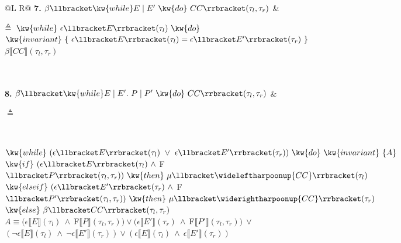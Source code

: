 \begin{figure}[ht]
\begin{minipage}{\linewidth}
\begin{tabularx}{\linewidth}{@{}L R@{}}
      \textbf{7. } $\beta\llbracket \kw{while } E\mid E' \ \kw{do}\ CC\rrbracket(\tau_l,\tau_r)$ &
      \parbox[t]{\hsize}{%
        $\triangleq\ \kw{while}\ \epsilon\llbracket E\rrbracket(\tau_l)\ \kw{do}$\\[2pt]
        \hspace{2.2em}\text{  }\text{  }\text{  }\text{  }\text{  }\text{  }\text{  }\text{  } $\kw{invariant}\ \{\ \epsilon\llbracket E\rrbracket(\tau_l)=\epsilon\llbracket E'\rrbracket(\tau_r)\ \}$\\[2pt]
        \hspace{2.2em}\text{  }\text{  }\text{  }\text{  }\text{  }\text{  }\text{  }\text{  } $\beta\llbracket CC\rrbracket(\tau_l,\tau_r)$
      } \\[8pt]
      \\

      \textbf{8. } $\beta\llbracket \kw{while } E\mid E' .\ P\mid P' \ \kw{do}\ CC\rrbracket(\tau_l,\tau_r)$ &
      \parbox[t]{\hsize}{$\triangleq$} \\[2pt]
    \end{tabularx} 

    \vspace{2pt} 
    \noindent\begin{minipage}[t]{\linewidth} 
      \raggedright
      \hspace{1.1em}$\kw{while}\ (\epsilon\llbracket E\rrbracket(\tau_l)\ \lor\ \epsilon\llbracket E'\rrbracket(\tau_r))\ \kw{do}\ \kw{invariant}\ \{A\}$\\[2pt]
      \hspace{2.2em}$\kw{if}\ (\epsilon\llbracket E\rrbracket(\tau_l)\ \land\ $F$\llbracket P\rrbracket(\tau_l,\tau_r))\ \kw{then}\ \mu\llbracket \wideleftharpoonup{CC}\rrbracket(\tau_l)$\\[2pt]
      \hspace{2.2em}$\kw{else if}\ (\epsilon\llbracket E'\rrbracket(\tau_r)\ \land\ $F$\llbracket P'\rrbracket(\tau_l,\tau_r))\ \kw{then}\ \mu\llbracket \widerightharpoonup{CC}\rrbracket(\tau_r)$\\[2pt]
      \hspace{2.2em}$\kw{else}\ \beta\llbracket CC\rrbracket(\tau_l,\tau_r)$\\[2pt]
      \hspace{1.2em} $A \equiv (\epsilon\llbracket E\rrbracket(\tau_l)\ \land\ $F$\llbracket P\rrbracket(\tau_l,\tau_r)) \lor (\epsilon\llbracket E'\rrbracket(\tau_r)\ \land\ $F$\llbracket P'\rrbracket(\tau_l,\tau_r))\ \lor$\\[2pt]
      \hspace{4.0em}\text{  }\text{  }\text{  }\text{  }\text{  }\text{  }\text{  }\text{  }\text{  } $(\neg\epsilon\llbracket E\rrbracket(\tau_l)\ \land\ \neg\epsilon\llbracket E'\rrbracket(\tau_r)) \lor (\epsilon\llbracket E\rrbracket(\tau_l)\ \land\ \epsilon\llbracket E'\rrbracket(\tau_r))$
    \end{minipage}
    \vspace{2pt}


\end{minipage}
\end{figure}
